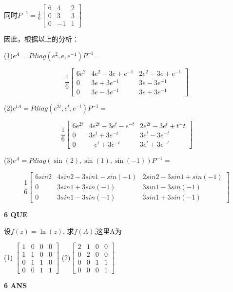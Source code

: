 \documentclass[11pt,letterpaper]{ctexart}
\begin{document}
\begin{enumerate}
同时$P^{-1} = \frac{1}{6} \begin{bmatrix}
	6 & 4 & 2 \\
	0 & 3 & 3 \\
	0 & -1 & 1
\end{bmatrix}$


因此，根据以上的分析：

(1)$e^A = Pdiag(e^2, e, e^{-1})P^{-1} = $

\[ \frac{1}{6}  \begin{bmatrix}
	6e^2 & 4e^2 - 3e + e^{-1} & 2e^2 - 3e +e^{-1} \\
	0 & 3e +3e^{-1} & 3e -3e^{-1} \\
	0 & 3e -3e^{-1} & 3e + 3e^{-1} 
\end{bmatrix}\]

(2)$e^{tA} = Pdiag(e^{2t}, e^t, e^{-t})P^{-1} = $

\[ \frac{1}{6}  \begin{bmatrix}
	6e^{2t} & 4e^{2t}-3e^t-e^{-t} & 2e^{2t} -3e^t + t^-t \\
	0 & 3e^t +3e^{-t} & 3e^t -3e^{-t} \\
	0 & -e^t + 3e^{-t} & 3e^t + 3e^{-t}
\end{bmatrix}\]

(3)$e^A = Pdiag(\sin(2), \sin(1), \sin(-1))P^{-1} = $

\[ \frac{1}{6}  \begin{bmatrix}
	6sin2 & 4sin2 -3sin1 -sin(-1) & 2sin2 -3sin1 + sin(-1) \\
	0 & 3sin1 + 3sin(-1) & 3sin1 -3sin(-1) \\
	0 & 3sin1 - 3sin(-1) & 3sin1 + 3sin(-1)
\end{bmatrix}\]

\textbf{6 QUE}
\bigskip

设$f(z) = \ln(z)$, 求$f(A)$,这里A为

(1) $\begin{bmatrix}
	1 & 0 & 0 & 0 \\
	1 & 1 & 0 & 0 \\
	0 & 1 & 1 & 0 \\
	0 & 0 & 1 & 1
\end{bmatrix}$
\qquad \qquad (2)$\begin{bmatrix}
	2 & 1 & 0 & 0 \\
	0 & 2 & 0 & 0 \\
	0 & 0 & 1 & 1 \\
	0 & 0 & 0 & 1
\end{bmatrix}$

\textbf{6 ANS}
\bigskip


\end{enumerate}
\end{document}

